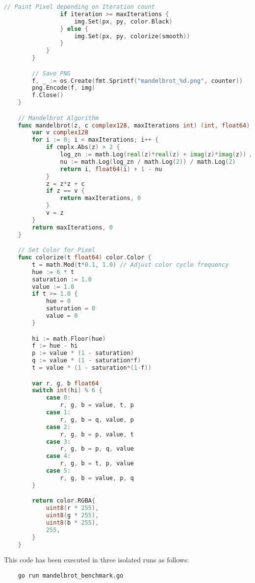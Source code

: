 \begin{lstlisting}[language=go, frame=tb, caption={Mandelbrot Set Calculation: Go (native benchamrk)}]
                // Paint Pixel depending on Iteration count
                if iteration >= maxIterations {
                    img.Set(px, py, color.Black)
                } else {
                    img.Set(px, py, colorize(smooth))
                }
            }
        }

        // Save PNG
        f, _ := os.Create(fmt.Sprintf("mandelbrot_%d.png", counter))
        png.Encode(f, img)
        f.Close()
    }

    // Mandelbrot Algorithm
    func mandelbrot(z, c complex128, maxIterations int) (int, float64) {
        var v complex128
        for i := 0; i < maxIterations; i++ {
            if cmplx.Abs(z) > 2 {
                log_zn := math.Log(real(z)*real(z) + imag(z)*imag(z)) / 2
                nu := math.Log(log_zn / math.Log(2)) / math.Log(2)
                return i, float64(i) + 1 - nu
            }
            z = z*z + c
            if z == v {
                return maxIterations, 0
            }
            v = z
        }
        return maxIterations, 0
    }

    // Set Color for Pixel
    func colorize(t float64) color.Color {
        t = math.Mod(t*0.1, 1.0) // Adjust color cycle frequency
        hue := 6 * t
        saturation := 1.0
        value := 1.0
        if t >= 1.0 {
            hue = 0
            saturation = 0
            value = 0
        }

        hi := math.Floor(hue)
        f := hue - hi
        p := value * (1 - saturation)
        q := value * (1 - saturation*f)
        t = value * (1 - saturation*(1-f))

        var r, g, b float64
        switch int(hi) % 6 {
            case 0:
                r, g, b = value, t, p
            case 1:
                r, g, b = q, value, p
            case 2:
                r, g, b = p, value, t
            case 3:
                r, g, b = p, q, value
            case 4:
                r, g, b = t, p, value
            case 5:
                r, g, b = value, p, q
        }

        return color.RGBA{
            uint8(r * 255),
            uint8(g * 255),
            uint8(b * 255),
            255,
        }
    }    
\end{lstlisting}

This code has been executed in three isolated runs as follows:
\begin{lstlisting}
    go run mandelbrot_benchmark.go
\end{lstlisting}

